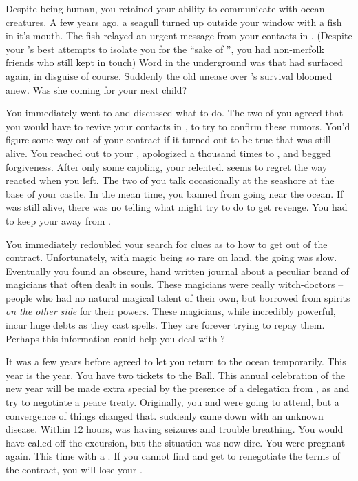 \documentclass[char]{NeptuneBall}
\begin{document}
Despite being human, you retained your ability to communicate with ocean creatures. A few years ago, a seagull turned up outside your window with a fish in it's mouth. The fish relayed an urgent message from your contacts in \pAtlantis{}. (Despite your \cKing{\parent}'s best attempts to isolate you for the ``sake of \pAtlantis{}'', you had non-merfolk friends who still kept in touch) Word in the underground was that \cWitch{} had surfaced again, in disguise of course.  Suddenly the old unease over \cWitch{}'s survival bloomed anew. Was she coming for your next child? 

You immediately went to \cEric{} and discussed what to do. The two of you agreed that you would have to revive your contacts in \pAtlantis{}, to try to confirm these rumors. You'd figure some way out of your contract if it turned out to be true that \cWitch{} was still alive. You reached out to your \cKing{\parent}, apologized a thousand times to \cKing{\them}, and begged \cKing{\their} forgiveness. After only some cajoling, your \cKing{\parent} relented. \cKing{\They} seems to regret the way \cKing{\they} reacted when you left. The two of you talk occasionally at the seashore at the base of your castle.  In the mean time, you banned \cWillow{} from going near the ocean. If \cWitch{} was still alive, there was no telling what \cWitch{\they} might try to do to get revenge. You had to keep your \cWillow{\offspring} away from \cWitch{}.

You immediately redoubled your search for clues as to how to get out of the contract. Unfortunately, with magic being so rare on land, the going was slow. Eventually you found an obscure, hand written journal about a peculiar brand of magicians that often dealt in souls. These magicians were really witch-doctors -- people who had no natural magical talent of their own, but borrowed from spirits \emph{on the other side} for their powers. These magicians, while incredibly powerful, incur huge debts as they cast spells. They are forever trying to repay them. Perhaps this information could help you deal with \cWitch{}?

It was a few years before \cKing{\King} \cKing{} agreed to let you return to the ocean temporarily. This year is the year. You have two tickets to the \cExExKing{} Ball. This annual celebration of the new year will be made extra special by the presence of a delegation from \pPacifica{}, as \pAtlantis{} and \pPacifica{} try to negotiate a peace treaty. Originally, you and \cEric{} were going to attend, but a convergence of things changed that. \cEric{} suddenly came down with an unknown disease. Within 12 hours, \cEric{} was having seizures and trouble breathing. You would have called off the excursion, but the situation was now dire. You were pregnant again. This time with a \cArielsSon{\offspring}. If you cannot find \cWitch{} and get \cWitch{\them} to renegotiate the terms of the contract, you will lose your \cArielsSon{\offspring} \cArielsSon{}.
\end{document}

